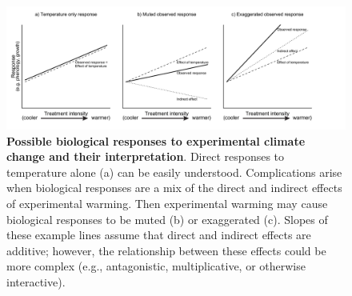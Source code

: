 \documentclass{article}
\begin{document}
 \begin{figure}[h]
 \includegraphics{../Analyses/figures/DirIndWarmingEffects.pdf} 
 \caption{\textbf{Possible biological responses to experimental climate change and their interpretation}. Direct responses to temperature alone (a) can be easily understood. Complications arise when biological responses are a mix of the direct and indirect effects of experimental warming. Then experimental warming may cause biological responses to be muted (b) or exaggerated (c). Slopes of these example lines assume that direct and indirect effects are additive; however, the relationship between these effects could be more complex (e.g., antagonistic, multiplicative, or otherwise interactive).} 
\label{fig:biolimp}
  \end{figure}
\end{document}
